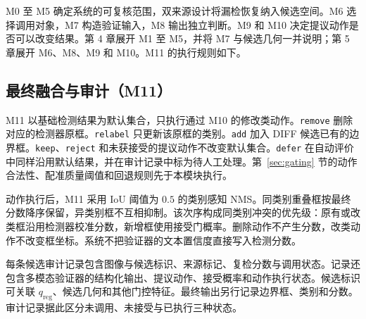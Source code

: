 M0 至 M5 确定系统的可复核范围，双来源设计将漏检恢复纳入候选空间。M6 选择调用对象，M7 构造验证输入，M8 输出独立判断。M9 和 M10 决定提议动作是否可以改变结果。第 4 章展开 M1 至 M5，并将 M7 与候选几何一并说明；第 5 章展开 M6、M8、M9 和 M10。M11 的执行规则如下。

\subsection{最终融合与审计（M11）}
\label{subsec:final-fusion}

M11 以基础检测结果为默认集合，只执行通过 M10 的修改类动作。\texttt{remove} 删除对应的检测器原框。\texttt{relabel} 只更新该原框的类别。\texttt{add} 加入 DIFF 候选已有的边界框。\texttt{keep}、\texttt{reject} 和未获接受的提议动作不改变默认集合。\texttt{defer} 在自动评价中同样沿用默认结果，并在审计记录中标为待人工处理。第~\ref{sec:gating} 节的动作合法性、配准质量阈值和回退规则先于本模块执行。

动作执行后，M11 采用 IoU 阈值为 $0.5$ 的类别感知 NMS。同类别重叠框按最终分数降序保留，异类别框不互相抑制。该次序构成同类别冲突的优先级：原有或改类框沿用检测器校准分数，新增框使用接受门概率。删除动作不产生分数，改类动作不改变框坐标。系统不把验证器的文本置信度直接写入检测分数。

每条候选审计记录包含图像与候选标识、来源标记、复检分数与调用状态。记录还包含多模态验证器的结构化输出、提议动作、接受概率和动作执行状态。候选标识可关联 $q_{\mathrm{reg}}$、候选几何和其他门控特征。最终输出另行记录边界框、类别和分数。审计记录据此区分未调用、未接受与已执行三种状态。
